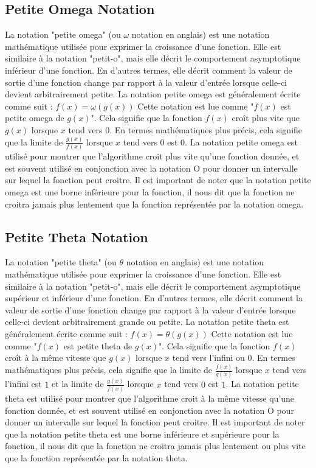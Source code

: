 \documentclass{article}
\begin{document}
    \subsection*{Petite Omega Notation}
    La notation "petite omega" (ou $\omega$ notation en anglais) est une notation mathématique utilisée pour exprimer la croissance d'une fonction. Elle est similaire à la notation "petit-o", mais elle décrit le comportement asymptotique inférieur d'une fonction. En d'autres termes, elle décrit comment la valeur de sortie d'une fonction change par rapport à la valeur d'entrée lorsque celle-ci devient arbitrairement petite.
    La notation petite omega est généralement écrite comme suit :
    $f(x) = \omega(g(x))$
    Cette notation est lue comme "$f(x)$ est petite omega de $g(x)$". Cela signifie que la fonction $f(x)$ croît plus vite que $g(x)$ lorsque $x$ tend vers $0$. En termes mathématiques plus précis, cela signifie que la limite de $\frac{g(x)}{f(x)}$ lorsque $x$ tend vers $0$ est $0$.
    La notation petite omega est utilisé pour montrer que l'algorithme croit plus vite qu'une fonction donnée, et est souvent utilisé en conjonction avec la notation O pour donner un intervalle sur lequel la fonction peut croitre. Il est important de noter que la notation petite omega est une borne inférieure pour la fonction, il nous dit que la fonction ne croitra jamais plus lentement que la fonction représentée par la notation omega.


    \subsection*{Petite Theta Notation}
    La notation "petite theta" (ou $\theta$ notation en anglais) est une notation mathématique utilisée pour exprimer la croissance d'une fonction. Elle est similaire à la notation "petit-o", mais elle décrit le comportement asymptotique supérieur et inférieur d'une fonction. En d'autres termes, elle décrit comment la valeur de sortie d'une fonction change par rapport à la valeur d'entrée lorsque celle-ci devient arbitrairement grande ou petite.
    La notation petite theta est généralement écrite comme suit :
    $f(x) = \theta(g(x))$
    Cette notation est lue comme "$f(x)$ est petite theta de $g(x)$". Cela signifie que la fonction $f(x)$ croît à la même vitesse que $g(x)$ lorsque $x$ tend vers l'infini ou $0$. En termes mathématiques plus précis, cela signifie que la limite de $\frac{f(x)}{g(x)}$ lorsque $x$ tend vers l'infini est $1$ et la limite de $\frac{g(x)}{f(x)}$ lorsque $x$ tend vers $0$ est $1$.
    La notation petite theta est utilisé pour montrer que l'algorithme croit à la même vitesse qu'une fonction donnée, et est souvent utilisé en conjonction avec la notation O pour donner un intervalle sur lequel la fonction peut croitre. Il est important de noter que la notation petite theta est une borne inférieure et supérieure pour la fonction, il nous dit que la fonction ne croitra jamais plus lentement ou plus vite que la fonction représentée par la notation theta.
   
\end{document}
